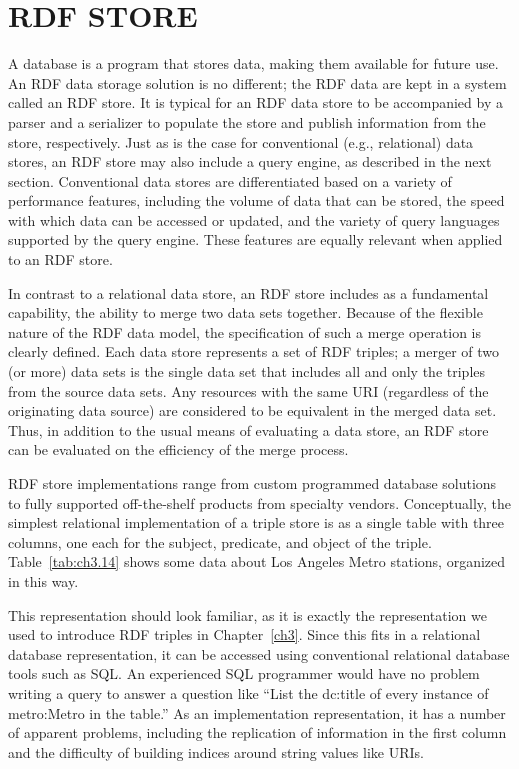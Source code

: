 \section{RDF STORE}

A database is a program that stores data, making them available for
future use. An RDF data storage solution is no different; the RDF data
are kept in a system called an RDF store. It is typical for an RDF data
store to be accompanied by a parser and a serializer to populate the
store and publish information from the store, respectively. Just as is
the case for conventional (e.g., relational) data stores, an RDF store
may also include a query engine, as described in the next section.
Conventional data stores are differentiated based on a variety of
performance features, including the volume of data that can be stored,
the speed with which data can be accessed or updated, and the variety of
query languages supported by the query engine. These features are
equally relevant when applied to an RDF store.

In contrast to a relational data store, an RDF store includes as a
fundamental capability, the ability to merge two data sets together.
Because of the flexible nature of the RDF data model, the specification
of such a merge operation is clearly defined. Each data store represents
a set of RDF triples; a merger of two (or more) data sets is the single
data set that includes all and only the triples from the source data
sets. Any resources with the same URI (regardless of the originating
data source) are considered to be equivalent in the merged data set.
Thus, in addition to the usual means of evaluating a data store, an RDF
store can be evaluated on the efficiency of the merge process.

RDF store implementations range from custom programmed database
solutions to fully supported off-the-shelf products from specialty
vendors. Conceptually, the simplest relational implementation of a
triple store is as a single table with three columns, one each for the
subject, predicate, and object of the triple. Table~\ref{tab:ch3.14} shows some data
about Los Angeles Metro stations, organized in this way.

This representation should look familiar, as it is exactly the
representation we used to introduce
RDF triples in Chapter~\ref{ch3}. Since this fits in a relational database
representation, it can be accessed using conventional relational
database tools such as SQL. An experienced SQL programmer would have no
problem writing a query to answer a question like ``List the dc:title of
every instance of metro:Metro in the table.'' As an implementation
representation, it has a number of apparent problems, including the replication of information in the first column
and the difficulty of building indices around string values like URIs.

